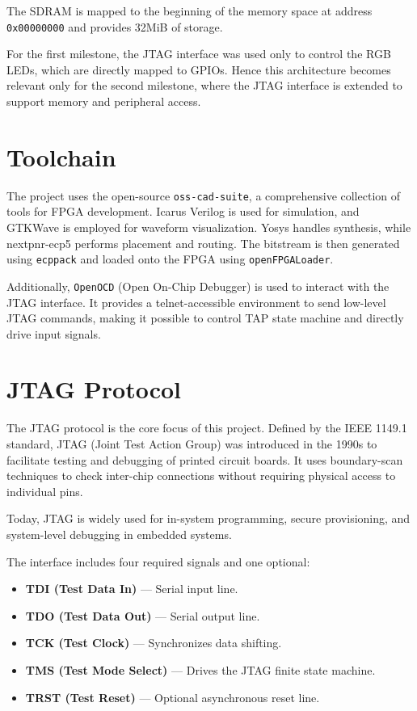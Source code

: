 \documentclass[a4paper,11pt,oneside]{report}
\begin{document}
The SDRAM is mapped to the beginning of the memory space at address \texttt{0x00000000} and provides 32MiB of storage.

For the first milestone, the JTAG interface was used only to control the RGB LEDs, which are directly mapped to GPIOs. Hence this architecture becomes relevant only for the second milestone,  
where the JTAG interface is extended to support memory and peripheral access.  

\section{Toolchain}
\label{sec:toolchain}

The project uses the open-source \texttt{oss-cad-suite}, a comprehensive collection of tools for FPGA development.
Icarus Verilog is used for simulation, and GTKWave is employed for waveform visualization.
Yosys handles synthesis, while nextpnr-ecp5 performs placement and routing.
The bitstream is then generated using \texttt{ecppack} and loaded onto the FPGA using \texttt{openFPGALoader}.

Additionally, \texttt{OpenOCD} (Open On-Chip Debugger) is used  
to interact with the JTAG interface.  
It provides a telnet-accessible environment to send low-level JTAG commands,  
making it possible to control TAP state machine and directly drive input signals.  


\section{JTAG Protocol}
\label{sec:JTAG}

The JTAG protocol is the core focus of this project.  
Defined by the IEEE 1149.1 standard,  
JTAG (Joint Test Action Group) was introduced in the 1990s  
to facilitate testing and debugging of printed circuit boards.  
It uses boundary-scan techniques to check inter-chip connections  
without requiring physical access to individual pins.  

Today, JTAG is widely used for in-system programming, secure provisioning,  
and system-level debugging in embedded systems.  

The interface includes four required signals and one optional:  

\begin{itemize}
    \item \textbf{TDI (Test Data In)} — Serial input line.  
    \item \textbf{TDO (Test Data Out)} — Serial output line.  
    \item \textbf{TCK (Test Clock)} — Synchronizes data shifting.  
    \item \textbf{TMS (Test Mode Select)} — Drives the JTAG finite state machine.  
    \item \textbf{TRST (Test Reset)} — Optional asynchronous reset line.  
\end{itemize}
\end{document}
